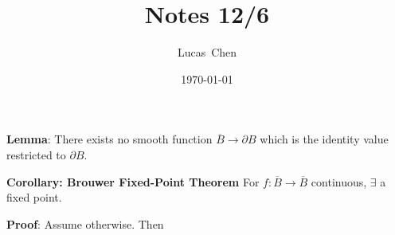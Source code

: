 \documentclass{amsart}
\title{Notes 12/6}
\author{Lucas\ Chen}
\date{\today}
\begin{document}
\maketitle

\medskip \noindent \textbf{Lemma}: There exists no smooth function $\overline{B}\to\partial B$ which is the identity value restricted to $\partial B$.

\medskip \noindent \textbf{Corollary: Brouwer Fixed-Point Theorem} For $f:\overline{B}\to\overline{B}$ continuous, $\exists$ a fixed point.

\textbf{Proof}: Assume otherwise. Then 
\end{document}
